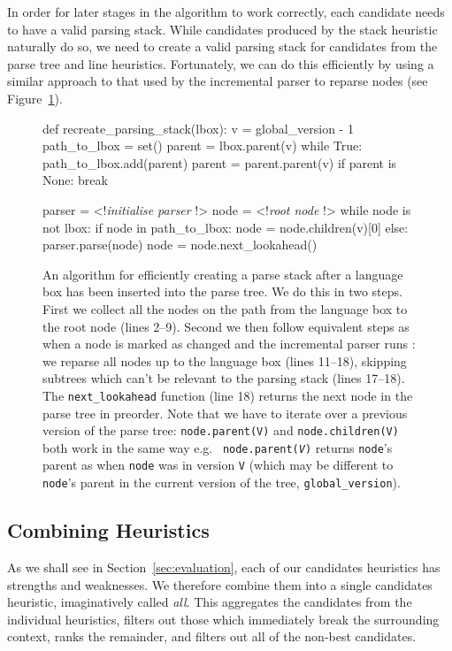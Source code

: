 \documentclass[sigplan,screen]{acmart}
\begin{document}
In order for later stages in the algorithm to work correctly, each candidate
needs to have a valid parsing stack. While candidates produced by the stack
heuristic naturally do so, we need to create a
valid parsing stack for candidates from the parse tree and line heuristics.
Fortunately, we can do this efficiently by
using a similar approach to that used by the incremental parser to reparse
nodes (see Figure~\ref{fig:createparsestack}).

\begin{figure}
\begin{lstdefault}[]
def recreate_parsing_stack(lbox):
  v = global_version - 1
  path_to_lbox = set()
  parent = lbox.parent(v)
  while True:
    path_to_lbox.add(parent)
    parent = parent.parent(v)
    if parent is None:
      break

  parser = <!\textrm{\textit{initialise parser}} !>
  node = <!\textrm{\textit{root node}} !>
  while node is not lbox:
    if node in path_to_lbox:
      node = node.children(v)[0]
    else:
      parser.parse(node)
      node = node.next_lookahead()
\end{lstdefault}
\caption{An algorithm for efficiently creating a parse stack after a language box
has been inserted into the parse tree. We do this in two steps. First we
collect all the nodes on the path from the language box to the root node (lines
2--9). Second we then follow equivalent steps as when a node is marked as
changed and the incremental parser runs \cite[p.~63]{wagner98practicalalgorithms}:
we reparse all nodes up to the language box (lines 11--18), skipping
subtrees which can't be relevant to the parsing stack (lines 17--18). The
\texttt{next\_lookahead} function (line 18) returns the next node in the parse
tree in preorder. Note that we have to iterate over a previous version of the
parse tree: \texttt{node.parent(V)} and \texttt{node.children(V)} both work in
the same way e.g.~ \texttt{node.parent(\textit{V})} returns \texttt{node}'s
parent as when \texttt{node} was in version \texttt{V} (which may be
different to \texttt{node}'s parent in the current version of the tree,
\texttt{global\_version}).}
\label{fig:createparsestack}
\end{figure}


\subsection{Combining Heuristics}
\label{sec:allheuristic}

As we shall see in Section~\ref{sec:evaluation}, each of our candidates
heuristics has strengths and weaknesses. We therefore combine them into a
single candidates heuristic, imaginatively called \emph{all}. This aggregates
the candidates from the individual heuristics, filters out those which
immediately break the surrounding context, ranks the remainder, and filters out all
of the non-best candidates.
\end{document}
